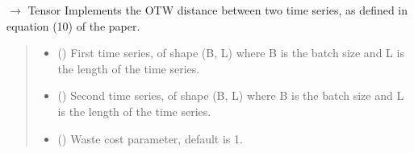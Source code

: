 \documentclass[letterpaper,10pt,english]{sphinxmanual}
\begin{document}

\begin{fulllineitems}
\label{\detokenize{dtw_loss_functions.otw:dtw_loss_functions.otw.otw_distance}}
\pysigstartsignatures
\pysiglinewithargsret
{}
{\sphinxparamcomma {}\sphinxparamcomma {}\sphinxparamcomma {}\sphinxparamcomma {}\sphinxparamcomma {}}
{{ $\rightarrow$ Tensor}}
\pysigstopsignatures
\sphinxAtStartPar
Implements the OTW distance between two time series, as defined in equation (10) of the paper.
\begin{quote}\begin{description}
\begin{itemize}
\item {} 
\sphinxAtStartPar
{} () \textendash{} First time series, of shape (B, L) where B is the batch size and L is the length of the time series.

\item {} 
\sphinxAtStartPar
{} () \textendash{} Second time series, of shape (B, L) where B is the batch size and L is the length of the time series.

\item {} 
\sphinxAtStartPar
{} () \textendash{} Waste cost parameter, default is 1.


\end{itemize}
\end{description}
\end{quote}
\end{fulllineitems}
\end{document}
